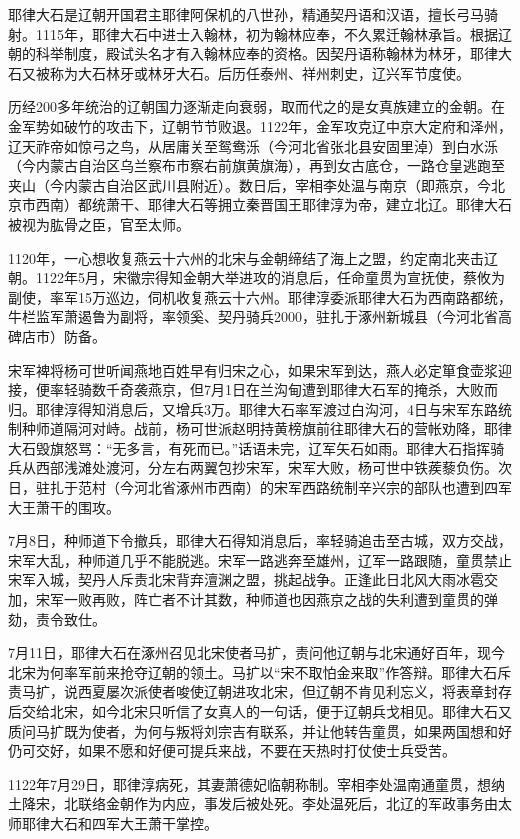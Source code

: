 耶律大石是辽朝开国君主耶律阿保机的八世孙，精通契丹语和汉语，擅长弓马骑射。1115年，耶律大石中进士入翰林，初为翰林应奉，不久累迁翰林承旨。根据辽朝的科举制度，殿试头名才有入翰林应奉的资格。因契丹语称翰林为林牙，耶律大石又被称为大石林牙或林牙大石。后历任泰州、祥州刺史，辽兴军节度使。

历经200多年统治的辽朝国力逐渐走向衰弱，取而代之的是女真族建立的金朝。在金军势如破竹的攻击下，辽朝节节败退。1122年，金军攻克辽中京大定府和泽州，辽天祚帝如惊弓之鸟，从居庸关至鸳鸯泺（今河北省张北县安固里淖）到白水泺（今内蒙古自治区乌兰察布市察右前旗黄旗海），再到女古底仓，一路仓皇逃跑至夹山（今内蒙古自治区武川县附近）。数日后，宰相李处温与南京（即燕京，今北京市西南）都统萧干、耶律大石等拥立秦晋国王耶律淳为帝，建立北辽。耶律大石被视为肱骨之臣，官至太师。

1120年，一心想收复燕云十六州的北宋与金朝缔结了海上之盟，约定南北夹击辽朝。1122年5月，宋徽宗得知金朝大举进攻的消息后，任命童贯为宣抚使，蔡攸为副使，率军15万巡边，伺机收复燕云十六州。耶律淳委派耶律大石为西南路都统，牛栏监军萧遏鲁为副将，率领奚、契丹骑兵2000，驻扎于涿州新城县（今河北省高碑店市）防备。

宋军裨将杨可世听闻燕地百姓早有归宋之心，如果宋军到达，燕人必定箪食壶浆迎接，便率轻骑数千奇袭燕京，但7月1日在兰沟甸遭到耶律大石军的掩杀，大败而归。耶律淳得知消息后，又增兵3万。耶律大石率军渡过白沟河，4日与宋军东路统制种师道隔河对峙。战前，杨可世派赵明持黄榜旗前往耶律大石的营帐劝降，耶律大石毁旗怒骂：“无多言，有死而已。”话语未完，辽军矢石如雨。耶律大石指挥骑兵从西部浅滩处渡河，分左右两翼包抄宋军，宋军大败，杨可世中铁蒺藜负伤。次日，驻扎于范村（今河北省涿州市西南）的宋军西路统制辛兴宗的部队也遭到四军大王萧干的围攻。

7月8日，种师道下令撤兵，耶律大石得知消息后，率轻骑追击至古城，双方交战，宋军大乱，种师道几乎不能脱逃。宋军一路逃奔至雄州，辽军一路跟随，童贯禁止宋军入城，契丹人斥责北宋背弃澶渊之盟，挑起战争。正逢此日北风大雨冰雹交加，宋军一败再败，阵亡者不计其数，种师道也因燕京之战的失利遭到童贯的弹劾，责令致仕。

7月11日，耶律大石在涿州召见北宋使者马扩，责问他辽朝与北宋通好百年，现今北宋为何率军前来抢夺辽朝的领土。马扩以“宋不取怕金来取”作答辩。耶律大石斥责马扩，说西夏屡次派使者唆使辽朝进攻北宋，但辽朝不肯见利忘义，将表章封存后交给北宋，如今北宋只听信了女真人的一句话，便于辽朝兵戈相见。耶律大石又质问马扩既为使者，为何与叛将刘宗吉有联系，并让他转告童贯，如果两国想和好仍可交好，如果不愿和好便可提兵来战，不要在天热时打仗使士兵受苦。

1122年7月29日，耶律淳病死，其妻萧德妃临朝称制。宰相李处温南通童贯，想纳土降宋，北联络金朝作为内应，事发后被处死。李处温死后，北辽的军政事务由太师耶律大石和四军大王萧干掌控。

